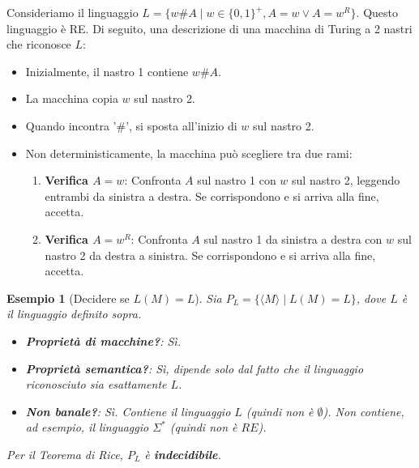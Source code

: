 \documentclass[a4paper]{article}
\newtheorem{example}{Esempio}
\begin{document}
Consideriamo il linguaggio $L = \{w\#A \mid w \in \{0,1\}^+, A=w \lor A=w^R \}$. Questo linguaggio è RE. Di seguito, una descrizione di una macchina di Turing a 2 nastri che riconosce $L$:
\begin{itemize}
    \item Inizialmente, il nastro 1 contiene $w\#A$.
    \item La macchina copia $w$ sul nastro 2.
    \item Quando incontra '\#', si sposta all'inizio di $w$ sul nastro 2.
    \item Non deterministicamente, la macchina può scegliere tra due rami:
        \begin{enumerate}
            \item \textbf{Verifica $A=w$}: Confronta $A$ sul nastro 1 con $w$ sul nastro 2, leggendo entrambi da sinistra a destra. Se corrispondono e si arriva alla fine, accetta.
            \item \textbf{Verifica $A=w^R$}: Confronta $A$ sul nastro 1 da sinistra a destra con $w$ sul nastro 2 da destra a sinistra. Se corrispondono e si arriva alla fine, accetta.
        \end{enumerate}
\end{itemize}

\begin{example}[Decidere se $L(M)=L$]
Sia $P_L = \{\langle M \rangle \mid L(M) = L\}$, dove $L$ è il linguaggio definito sopra.
\begin{itemize}
    \item \textbf{Proprietà di macchine?}: Sì.
    \item \textbf{Proprietà semantica?}: Sì, dipende solo dal fatto che il linguaggio riconosciuto sia esattamente $L$.
    \item \textbf{Non banale?}: Sì. Contiene il linguaggio $L$ (quindi non è $\emptyset$). Non contiene, ad esempio, il linguaggio $\Sigma^*$ (quindi non è $RE$).
\end{itemize}
Per il Teorema di Rice, $P_L$ è \textbf{indecidibile}.
\end{example}
\end{document}
